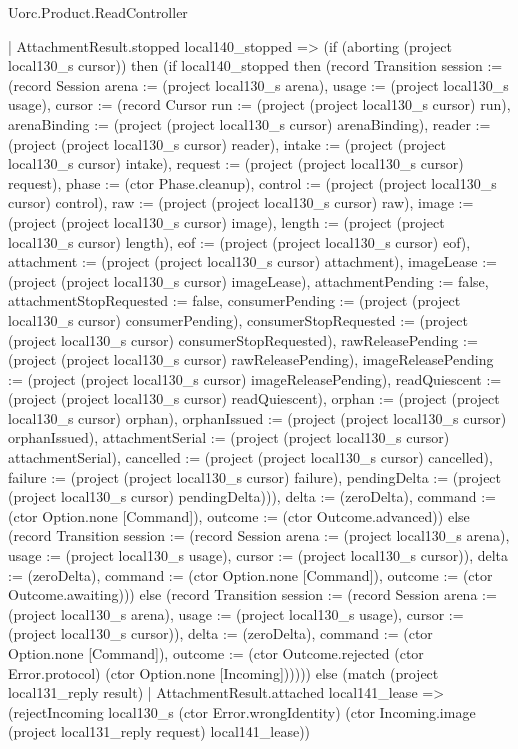 \begin{lexlean}{Uorc.Product.ReadController}
\begin{semanticmodule}
{      | AttachmentResult.stopped local140_stopped => (if (aborting (project local130_s cursor)) then (if local140_stopped then (record Transition {session := (record Session {arena := (project local130_s arena), usage := (project local130_s usage), cursor := (record Cursor {run := (project (project local130_s cursor) run), arenaBinding := (project (project local130_s cursor) arenaBinding), reader := (project (project local130_s cursor) reader), intake := (project (project local130_s cursor) intake), request := (project (project local130_s cursor) request), phase := (ctor Phase.cleanup), control := (project (project local130_s cursor) control), raw := (project (project local130_s cursor) raw), image := (project (project local130_s cursor) image), length := (project (project local130_s cursor) length), eof := (project (project local130_s cursor) eof), attachment := (project (project local130_s cursor) attachment), imageLease := (project (project local130_s cursor) imageLease), attachmentPending := false, attachmentStopRequested := false, consumerPending := (project (project local130_s cursor) consumerPending), consumerStopRequested := (project (project local130_s cursor) consumerStopRequested), rawReleasePending := (project (project local130_s cursor) rawReleasePending), imageReleasePending := (project (project local130_s cursor) imageReleasePending), readQuiescent := (project (project local130_s cursor) readQuiescent), orphan := (project (project local130_s cursor) orphan), orphanIssued := (project (project local130_s cursor) orphanIssued), attachmentSerial := (project (project local130_s cursor) attachmentSerial), cancelled := (project (project local130_s cursor) cancelled), failure := (project (project local130_s cursor) failure), pendingDelta := (project (project local130_s cursor) pendingDelta)})}), delta := (zeroDelta), command := (ctor Option.none [Command]), outcome := (ctor Outcome.advanced)}) else (record Transition {session := (record Session {arena := (project local130_s arena), usage := (project local130_s usage), cursor := (project local130_s cursor)}), delta := (zeroDelta), command := (ctor Option.none [Command]), outcome := (ctor Outcome.awaiting)})) else (record Transition {session := (record Session {arena := (project local130_s arena), usage := (project local130_s usage), cursor := (project local130_s cursor)}), delta := (zeroDelta), command := (ctor Option.none [Command]), outcome := (ctor Outcome.rejected (ctor Error.protocol) (ctor Option.none [Incoming]))}))) else (match (project local131_reply result)
      | AttachmentResult.attached local141_lease => (rejectIncoming local130_s (ctor Error.wrongIdentity) (ctor Incoming.image (project local131_reply request) local141_lease))
}
\end{semanticmodule}
\end{lexlean}
